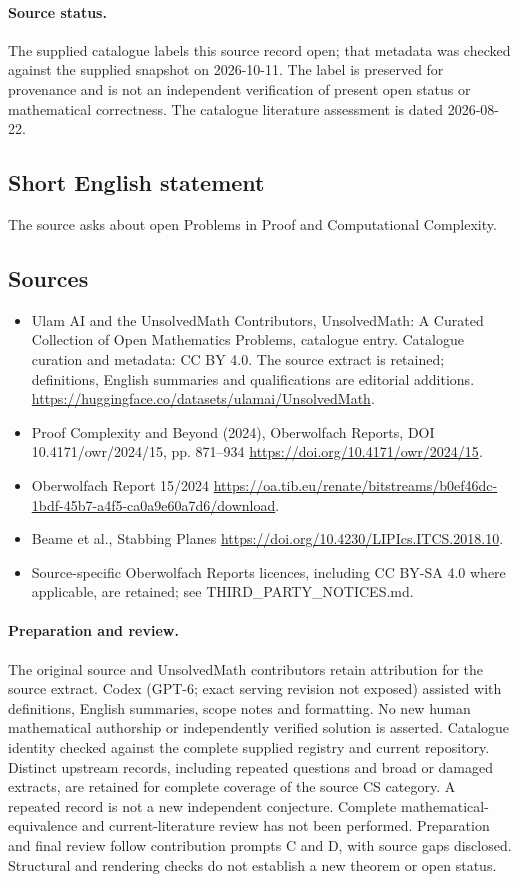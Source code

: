 \documentclass[11pt]{article}
\begin{document}
\paragraph{Source status.}
The supplied catalogue labels this source record open; that metadata was checked against the supplied snapshot on 2026-10-11. The label is preserved for provenance and is not an independent verification of present open status or mathematical correctness. The catalogue literature assessment is dated 2026-08-22.
\subsection{Short English statement}
The source asks about open Problems in Proof and Computational Complexity.
\subsection{Sources}
\begin{itemize}
\item[S1] Ulam AI and the UnsolvedMath Contributors, UnsolvedMath: A Curated Collection of Open Mathematics Problems, catalogue entry. Catalogue curation and metadata: CC BY 4.0. The source extract is retained; definitions, English summaries and qualifications are editorial additions.
\url{https://huggingface.co/datasets/ulamai/UnsolvedMath}.
\item[S2] Proof Complexity and Beyond (2024), Oberwolfach Reports, DOI 10.4171/owr/2024/15, pp. 871--934
\url{https://doi.org/10.4171/owr/2024/15}.
\item[S3] Oberwolfach Report 15/2024
\url{https://oa.tib.eu/renate/bitstreams/b0ef46dc-1bdf-45b7-a4f5-ca0a9e60a7d6/download}.
\item[S4] Beame et al., Stabbing Planes
\url{https://doi.org/10.4230/LIPIcs.ITCS.2018.10}.
\item Source-specific Oberwolfach Reports licences, including CC BY-SA 4.0 where applicable, are retained; see THIRD\_PARTY\_NOTICES.md.
\end{itemize}
\paragraph{Preparation and review.}
The original source and UnsolvedMath contributors retain attribution for the source extract. Codex (GPT-6; exact serving revision not exposed) assisted with definitions, English summaries, scope notes and formatting. No new human mathematical authorship or independently verified solution is asserted. Catalogue identity checked against the complete supplied registry and current repository. Distinct upstream records, including repeated questions and broad or damaged extracts, are retained for complete coverage of the source CS category. A repeated record is not a new independent conjecture. Complete mathematical-equivalence and current-literature review has not been performed. Preparation and final review follow contribution prompts C and D, with source gaps disclosed. Structural and rendering checks do not establish a new theorem or open status.
\label{end:statement}
\end{document}
